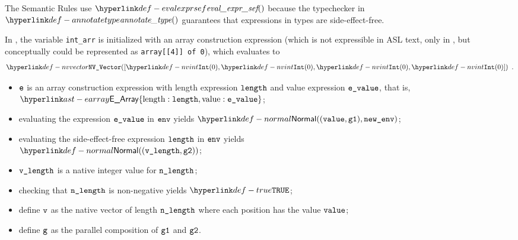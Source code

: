 The Semantic Rules use $\evalexprsef\empty$ because the typechecker in
$\annotatetype$ guarantees that expressions in types are side-effect-free.

In ,
the variable \verb|int_arr| is initialized with an array construction expression
(which is not expressible in ASL text, only in \typedast, but conceptually could be
represented as \verb|array[[4]] of 0|),
which evaluates to
\[
\nvvector{[\nvint(0), \nvint(0), \nvint(0), \nvint(0)]} \enspace.
\]

\ProseParagraph
\AllApply
\begin{itemize}
  \item $\ve$ is an array construction expression with length expression $\elength$ and value expression $\evalue$,
        that is, $\EArray\{\EArrayLength: \elength, \EArrayValue: \evalue\}$;
  \item evaluating the expression $\evalue$ in $\env$ yields $\Normal((\vvalue, \vgone), \newenv)$\ProseOrAbnormal;
  \item evaluating the side-effect-free expression $\elength$ in $\env$ yields \\
        $\Normal((\vlength, \vgtwo))$\ProseOrError;
  \item $\vlength$ is a native integer value for $\nlength$;
  \item checking that $\nlength$ is non-negative yields $\True$\ProseTerminateAs{\NegativeArrayLength};
  \item define $\vv$ as the native vector of length $\nlength$ where each position has the value $\vvalue$;
  \item define $\vg$ as the parallel composition of $\vgone$ and $\vgtwo$.
\end{itemize}

\FormallyParagraph
\begin{mathpar}
\end{mathpar}

